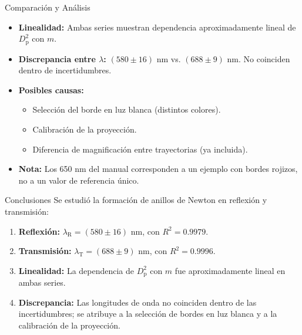 \documentclass[aspectratio=169]{beamer}
\begin{document}
\begin{frame}{Comparación y Análisis}
    \begin{itemize}
        \item \textbf{\textcolor{neonblue}{Linealidad:}} Ambas series muestran dependencia aproximadamente lineal de $D_{\mathrm p}^2$ con $m$.
        \vspace{0.2cm}
        \item \textbf{\textcolor{neonblue}{Discrepancia entre $\lambda$:}} $(580 \pm 16)$ nm vs. $(688 \pm 9)$ nm. No coinciden dentro de incertidumbres.
        \vspace{0.2cm}
        \item \textbf{\textcolor{neonblue}{Posibles causas:}}
        \begin{itemize}
            \item Selección del borde en luz blanca (distintos colores).
            \item Calibración de la proyección.
            \item Diferencia de magnificación entre trayectorias (ya incluida).
        \end{itemize}
        \vspace{0.2cm}
        \item \textbf{\textcolor{neonblue}{Nota:}} Los 650 nm del manual corresponden a un ejemplo con bordes rojizos, no a un valor de referencia único.
    \end{itemize}
\end{frame}

\begin{frame}{Conclusiones}
    Se estudió la formación de anillos de Newton en reflexión y transmisión:
    \vspace{0.3cm}
    \begin{enumerate}
        \item \textbf{\textcolor{neonblue}{Reflexión:}} $\lambda_{\mathrm R} = (580 \pm 16)$ nm, con $R^2 = 0.9979$.
        \vspace{0.2cm}
        \item \textbf{\textcolor{neonblue}{Transmisión:}} $\lambda_{\mathrm T} = (688 \pm 9)$ nm, con $R^2 = 0.9996$.
        \vspace{0.2cm}
        \item \textbf{\textcolor{neonblue}{Linealidad:}} La dependencia de $D_{\mathrm p}^2$ con $m$ fue aproximadamente lineal en ambas series.
        \vspace{0.2cm}
        \item \textbf{\textcolor{neonblue}{Discrepancia:}} Las longitudes de onda no coinciden dentro de las incertidumbres; se atribuye a la selección de bordes en luz blanca y a la calibración de la proyección.
    \end{enumerate}
\end{frame}
\end{document}

